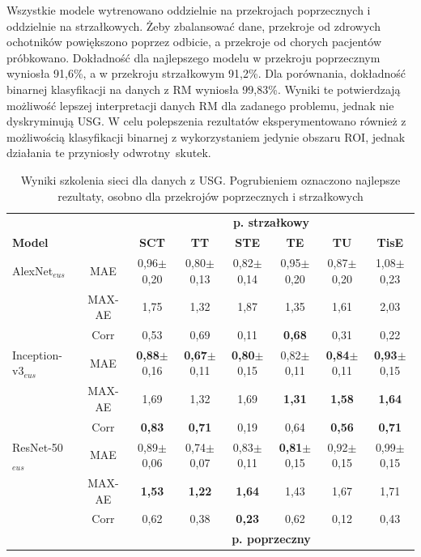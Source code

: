 Wszystkie modele wytrenowano oddzielnie na przekrojach poprzecznych i oddzielnie na strzałkowych. Żeby zbalansować dane, przekroje od zdrowych ochotników powiększono poprzez odbicie, a przekroje od chorych pacjentów próbkowano. Dokładność dla najlepszego modelu w przekroju poprzecznym wyniosła 91,6\%, \linebreak a w przekroju strzałkowym 91,2\%. Dla porównania, dokładność binarnej klasyfikacji na danych z RM wyniosła 99,83\%. Wyniki te potwierdzają możliwość lepszej interpretacji danych RM dla zadanego problemu, jednak nie dyskryminują USG. W celu polepszenia rezultatów eksperymentowano również z możliwością klasyfikacji binarnej z wykorzystaniem jedynie obszaru ROI, jednak działania te przyniosły odwrotny~skutek.  
\vspace{10px}
\renewcommand{\arraystretch}{1.2}
\begin{table}[h]
	\scriptsize
	\setlength{\tabcolsep}{3pt}
	\centering
	\caption{Wyniki szkolenia sieci dla danych z USG. Pogrubieniem oznaczono najlepsze rezultaty, osobno dla przekrojów poprzecznych i strzałkowych}
	\label{tab:usg_train_cross-validation}
	\begin{tabular}{lc||c|c|c|c|c|c}
		& & \multicolumn{6}{c}{\textbf{p. strzałkowy}} \\
		\textbf{Model} & & \textbf{SCT} & \textbf{TT} & \textbf{STE} & \textbf{TE} & \textbf{TU} & \textbf{TisE} \\ \hline \hline
		AlexNet$_{eus}$ & MAE & 0,96$\pm$0,20 & 0,80$\pm$0,13 & 0,82$\pm$0,14 & 0,95$\pm$0,20 & 0,87$\pm$0,20 & 1,08$\pm$0,23  \\
		& MAX-AE & 1,75 & 1,32 & 1,87 & 1,35 & 1,61 & 2,03 \\ 
		& Corr & 0,53 & 0,69 & 0,11 & \textbf{0,68} & 0,31 & 0,22 \\ \hline
		Inception-v3$_{eus}$ & MAE & \textbf{0,88}$\pm$0,16 & \textbf{0,67}$\pm$0,11 & \textbf{0,80}$\pm$0,15 & 0,82$\pm$0,11 & \textbf{0,84}$\pm$0,11 & \textbf{0,93}$\pm$0,15  \\
		& MAX-AE & 1,69 & 1,32 & 1,69 & \textbf{1,31} & \textbf{1,58} & \textbf{1,64} \\ 
		& Corr & \textbf{0,83} & \textbf{0,71} & 0,19 & 0,64 & \textbf{0,56} & \textbf{0,71} \\ \hline
		ResNet-50$_{eus}$ & MAE & 0,89$\pm$0,06 & 0,74$\pm$0,07 & 0,83$\pm$0,11 & \textbf{0,81}$\pm$0,15 & 0,92$\pm$0,15 & 0,99$\pm$0,15 \\
		& MAX-AE & \textbf{1,53} & \textbf{1,22} & \textbf{1,64} & 1,43 & 1,67 & 1,71 \\
		& Corr & 0,62 & 0,38 & \textbf{0,23} & 0,62 & 0,12 & 0,43 \\ \hline \hline
		& & \multicolumn{6}{c}{\textbf{p. poprzeczny}} \\
		

\end{tabular}
\end{table}

